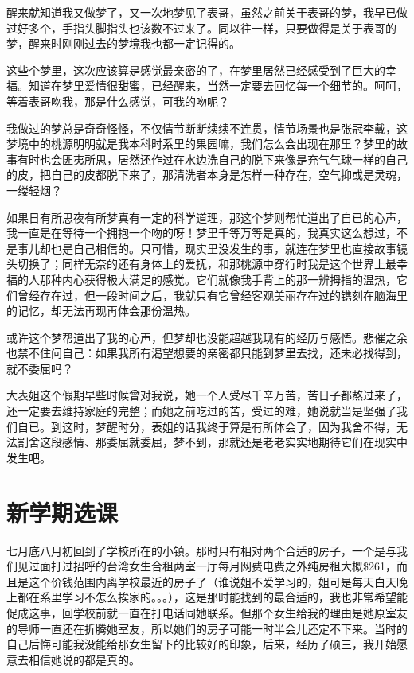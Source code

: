 \documentclass[12pt]{book}
\begin{document}
醒来就知道我又做梦了，又一次地梦见了表哥，虽然之前关于表哥的梦，我早已做过好多个，手指头脚指头也该数不过来了。同以往一样，只要做得是关于表哥的梦，醒来时刚刚过去的梦境我也都一定记得的。

这些个梦里，这次应该算是感觉最亲密的了，在梦里居然已经感受到了巨大的幸福。知道在梦里爱情很甜蜜，已经醒来，当然一定要去回忆每一个细节的。呵呵，等着表哥吻我，那是什么感觉，可我的吻呢？

我做过的梦总是奇奇怪怪，不仅情节断断续续不连贯，情节场景也是张冠李戴，这梦境中的桃源明明就是我本科时系里的果园嘛，我们怎么会出现在那里？梦里的故事有时也会匪夷所思，居然还作过在水边洗自己的脱下来像是充气气球一样的自己的皮，把自己的皮都脱下来了，那清洗者本身是怎样一种存在，空气抑或是灵魂，一缕轻烟？

如果日有所思夜有所梦真有一定的科学道理，那这个梦则帮忙道出了自已的心声，我一直是在等待一个拥抱一个吻的呀！梦里千等万等是真的，我真实这么想过，不是事儿却也是自己相信的。只可惜，现实里没发生的事，就连在梦里也直接故事镜头切换了；同样无奈的还有身体上的爱抚，和那桃源中穿行时我是这个世界上最幸福的人那种内心获得极大满足的感觉。它们就像我手背上的那一辨拇指的温热，它们曾经存在过，但一段时间之后，我就只有它曾经客观美丽存在过的镌刻在脑海里的记忆，却无法再现再体会那份温热。

或许这个梦帮道出了我的心声，但梦却也没能超越我现有的经历与感悟。悲催之余也禁不住问自己：如果我所有渴望想要的亲密都只能到梦里去找，还未必找得到，就不委屈吗？

大表姐这个假期早些时候曾对我说，她一个人受尽千辛万苦，苦日子都熬过来了，还一定要去维持家庭的完整；而她之前吃过的苦，受过的难，她说就当是坚强了我们自已。到这时，梦醒时分，表姐的话我终于算是有所体会了，因为我舍不得，无法割舍这段感情、那委屈就委屈，梦不到，那就还是老老实实地期待它们在现实中发生吧。　

\chapter{新学期选课}
\label{sec-7}
七月底八月初回到了学校所在的小镇。那时只有相对两个合适的房子，一个是与我们见过面打过招呼的台湾女生合租两室一厅每月网费电费之外纯房租大概\$261，而且是这个价钱范围内离学校最近的房子了（谁说姐不爱学习的，姐可是每天白天晚上都在系里学习不怎么挨家的。。。），这是那时能找到的最合适的，我也非常希望能促成这事，回学校前就一直在打电话同她联系。但那个女生给我的理由是她原室友的导师一直还在折腾她室友，所以她们的房子可能一时半会儿还定不下来。当时的自己后悔可能我没能给那女生留下的比较好的印象，后来，经历了硕三，我开始愿意去相信她说的都是真的。
\end{document}
